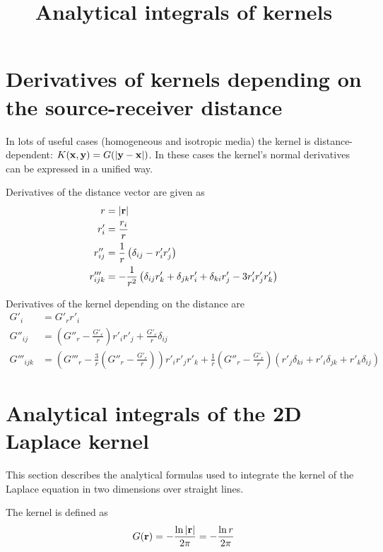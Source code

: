 \documentclass[a4paper,11pt]{article}
\title {Analytical integrals of kernels}
\begin{document}
\maketitle

\tableofcontents

\section{Derivatives of kernels depending on the source-receiver distance}

In lots of useful cases (homogeneous and isotropic media) the kernel is distance-dependent: $K({\bf x}, {\bf y}) = G(|{\bf y} - {\bf x}|)$.
In these cases the kernel's normal derivatives can be expressed in a unified way.

Derivatives of the distance vector are given as
%
\begin{align}
	r &= |{\bf r}| \\
	r'_i &= \frac{r_i}{r} \\
	r''_{ij} &= \frac{1}{r} \left( \delta_{ij} - r'_i r'_j \right) \\
	r'''_{ijk} &= -\frac{1}{r^2} \left(
		\delta_{ij} r'_k + \delta_{jk} r'_i + \delta_{ki} r'_j - 3 r'_i r'_j r'_k
	\right)
\end{align}

Derivatives of the kernel depending on the distance are
%
\begin{align}
	G'_i &= G'_r r'_i \\
	G''_{ij} &= \left(G''_r - \frac{G'_r}{r} \right) r'_i r'_j +  \frac{G'_r}{r} \delta_{ij} \\
	G'''_{ijk} &=
	\left(G'''_r -\frac{3}{r} \left(G''_r  - \frac{G'_r}{r} \right) \right) r'_i r'_j r'_k
	+  \frac{1}{r} \left( G''_r  - \frac{G'_r}{r} \right)\left(
	   r'_j \delta_{ki}
	+  r'_i \delta_{jk}
	+  r'_k \delta_{ij}
	\right)
\end{align}

\section{Analytical integrals of the 2D Laplace kernel}

This section describes the analytical formulas used to integrate the kernel of the Laplace equation in two dimensions over straight lines.

The kernel is defined as
%
\begin{equation}
	G({\bf r}) = -\frac{\ln |{\bf r}|}{2\pi} = -\frac{\ln r}{2\pi}
\end{equation}
\end{document}
